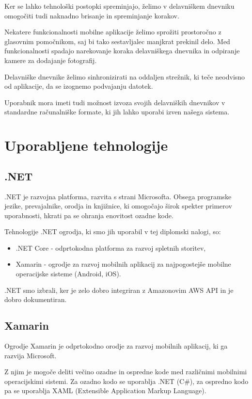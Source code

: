 \documentclass[a4paper, 12pt]{book}
\begin{document}
Ker se lahko tehnološki postopki spreminjajo, želimo v delavniškem dnevniku omogočiti tudi naknadno brisanje in spreminjanje korakov.

Nekatere funkcionalnosti mobilne aplikacije želimo sprožiti prostoročno z glasovnim pomočnikom, saj bi tako sestavljalec manjkrat prekinil delo.
Med funkcionalnosti spadajo narekovanje koraka delavniškega dnevnika in odpiranje kamere za dodajanje fotografij.

Delavniške dnevnike želimo sinhronizirati na oddaljen strežnik, ki teče neodvisno od aplikacije, da se izognemo podvajanju datotek.

Uporabnik mora imeti tudi možnost izvoza svojih delavniških dnevnikov v standardne računalniške formate, ki jih lahko uporabi izven našega sistema.


\section{Uporabljene tehnologije}

\subsection{.NET}

.NET \cite{dotnet} je razvojna platforma, razvita s strani Microsofta.
Obsega programske jezike, prevajalnike, orodja in knjižnice, ki omogočajo širok spekter primerov uporabnosti, hkrati pa se ohranja enovitost ozadne kode.

Tehnologije .NET ogrodja, ki smo jih uporabil v tej diplomski nalogi, so:
\begin{itemize}
	\item .NET Core - odprtokodna platforma za razvoj spletnih storitev,
	\item Xamarin - ogrodje za razvoj mobilnih aplikacij za najpogostejše mobilne operacijske sisteme (Android, iOS).
\end{itemize}

.NET smo izbrali, ker je zelo dobro integriran z Amazonovim AWS API in je dobro dokumentiran.



\subsection{Xamarin}

Ogrodje Xamarin \cite{xamarin} je odprtokodno orodje za razvoj mobilnih aplikacij, ki ga razvija Microsoft. 

Z njim je mogoče deliti večino ozadne in ospredne kode med različnimi mobilnimi operacijskimi sistemi. 
Za ozadno kodo se uporablja .NET (C\#), za ospredno kodo pa se uporablja XAML (Extensible Application Markup Language).
\end{document}
